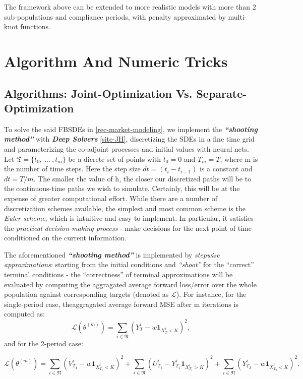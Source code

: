 \documentclass[a4paper,10pt]{article}
\newcommand{\1}{\mathbf{1}}
\begin{document}
The framework above can be extended to more realistic models with more
than 2 sub-populations and compliance periods, with penalty approximated
by multi-knot functions.

\section{Algorithm And Numeric
Tricks}

\subsection{Algorithms: Joint-Optimization Vs.
Separate-Optimization}

To solve the said FBSDEs in \ref{rec-market-modeling}, we
implement the \textbf{\emph{``shooting method''}} with \emph{\textbf{Deep Solvers}}
\ref{site-JH}, discretizing the SDEs in a fine time grid and parameterizing the
co-adjoint processes and initial values with neural nets. Let
\(\mathfrak{T}=\lbrace{t_0,~...~, t_m \rbrace}\) be a dicrete set of
points with \(t_0=0\) and \(T_m=T\), where m is the number of time
steps. Here the step size \(dt=(t_i-t_{i-1})\) is a constant and
\(dt=T/m\). The smaller the value of h, the closer our discretized paths
will be to the continuous-time paths we wish to simulate. Certainly,
this will be at the expense of greater computational effort. While there
are a number of discretization schemes available, the simplest and most
common scheme is the \emph{Euler scheme}, which is intuitive and easy to
implement. In particular, it satisfies the \emph{practical
decision-making process} - make decisions for the next point of time
conditioned on the current information.

The aforementioned \textbf{\emph{``shooting method''}} is implemented by
\emph{stepwise approximations}: starting from the initial conditions and
\emph{``shoot''} for the ``correct'' terminal conditions - the
``correctness'' of terminal approximations will be evaluated by
computing the aggragated average forward loss/error over the whole
population against corresponding targets (denoted as \(\mathcal{L}\)).
For instance, for the single-period case, theaggragated average forward
MSE after m iterations is computed as: \[
\mathcal{L}(\theta^{(m)})= \sum_{i\in\mathfrak{N}}(Y_{T}^i-w\mathbf{1}_{X_{T}^i<K})^2,
\] and for the 2-period case:

\[
\mathcal{L}(\theta^{(m)})= \sum_{i\in\mathfrak{N}}(V_{T_1}^i-w\mathbf{1}_{X_{T_1}^i<K})^2 + \sum_{i\in\mathfrak{N}}(U_{T_1}^i-Y_{T_1}^i\mathbf{1}_{X_{T_1}^i>K})^2 + \sum_{i\in\mathfrak{N}}(Y_{T_2}^i-w\mathbf{1}_{X_{T_2}^i<K})^2.
\]
\end{document}
